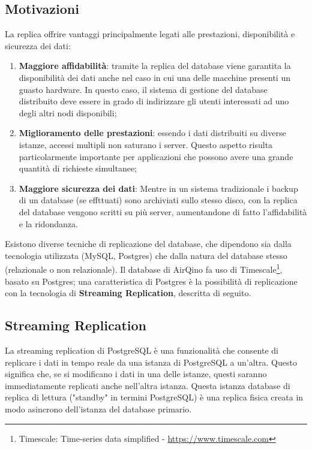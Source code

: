 \subsection{Motivazioni}\label{ssec:replica-motivazioni}
La replica offrire vantaggi principalmente legati alle prestazioni, disponibilità e sicurezza dei dati:
\begin{enumerate}
  \item \textbf{Maggiore affidabilità}: tramite la replica del database viene garantita la disponibilità dei dati anche nel caso in cui una delle macchine presenti un guasto hardware. In questo caso, il sistema di gestione del database distribuito deve essere in grado di indirizzare gli utenti interessati ad uno degli altri nodi disponibili;
  \item \textbf{Miglioramento delle prestazioni}: essendo i dati distribuiti su diverse istanze, accessi multipli non saturano i server. Questo aspetto risulta particolarmente importante per applicazioni che possono avere una grande quantità di richieste simultanee;
  \item \textbf{Maggiore sicurezza dei dati}: Mentre in un sistema tradizionale i backup di un database (se effttuati) sono archiviati sullo stesso disco, con la replica del database vengono scritti su più server, aumentandone di fatto l'affidabilità e la ridondanza.
\end{enumerate}

Esistono diverse tecniche di replicazione del database, che dipendono sia dalla tecnologia utilizzata (MySQL, Postgres) che dalla natura del database stesso (relazionale o non relazionale). Il database di AirQino fa uso di Timescale\footnote{Timescale: Time-series data simplified - \url{https://www.timescale.com}}, basato su Postgres; una caratteristica di Postgres è la possibilità di replicazione con la tecnologia di \textbf{Streaming Replication}, descritta di seguito.

\subsection{Streaming Replication}\label{ssec:streaming-replication}
La streaming replication di PostgreSQL è una funzionalità che consente di replicare i dati in tempo reale da una istanza di PostgreSQL a un'altra. Questo significa che, se si modificano i dati in una delle istanze, questi saranno immediatamente replicati anche nell'altra istanza. Questa istanza database di replica di lettura ("standby" in termini PostgreSQL) è una replica fisica creata in modo asincrono dell'istanza del database primario.

